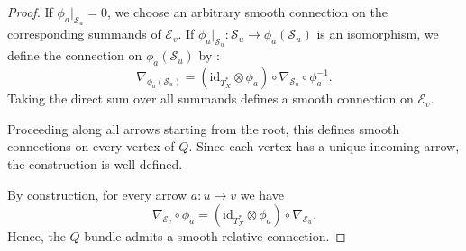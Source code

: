 \documentclass[10pt,a4paper]{amsart}
\begin{document}
\begin{proof}
If $\phi_a|_{\mathcal{S}_u} = 0$, we choose an arbitrary smooth
connection on the corresponding summands of $\mathcal{E}_v$. If $\phi_a|_{\mathcal{S}_u}
:
\mathcal{S}_u
\longrightarrow
\phi_a(\mathcal{S}_u)$ is an isomorphism, we define the connection on
$\phi_a(\mathcal{S}_u)$ by :
\[
\nabla_{\phi_a(\mathcal{S}_u)}
=
(\mathrm{id}_{T_X^*}\otimes \phi_a) \circ \nabla_{\mathcal{S}_u} \circ \phi_a^{-1}.
\]
Taking the direct sum over all summands defines a smooth
connection on $\mathcal{E}_v$.

Proceeding along all arrows starting from the root,
this defines smooth connections on every vertex of $Q$.
Since each vertex has a unique incoming arrow,
the construction is well defined.

By construction, for every arrow $a : u \to v$ we have
\[
\nabla_{\mathcal{E}_v} \circ \phi_a
=
(\mathrm{id}_{T^*_X} \otimes \phi_a)
\circ
\nabla_{\mathcal{E}_u}.
\]
Hence, the $Q$-bundle admits a smooth relative connection.
\end{proof}
\end{document}
